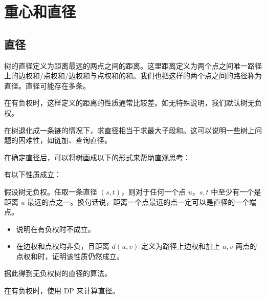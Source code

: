 \chapter{重心和直径}
\section{直径}

树的直径定义为距离最远的两点之间的距离。这里距离定义为两个点之间唯一路径上的边权和/点权和/边权和与点权和的和。我们也把这样的两个点之间的路径称为直径。直径可能存在多条。
\begin{remark}
    在有负权时，这样定义的距离的性质通常比较差。如无特殊说明，我们默认树无负权。
\end{remark}
\begin{remark}
    在树退化成一条链的情况下，求直径相当于求最大子段和。这可以说明一些树上问题的困难性，如链加、查询直径。
\end{remark}

在确定直径后，可以将树画成以下的形式来帮助直观思考：

\begin{center}
\end{center}

有以下性质成立：

\begin{property}
    假设树无负权。任取一条直径 $(s,t)$，则对于任何一个点 $u$，$s,t$ 中至少有一个是距离 $u$ 最远的点之一。换句话说，距离一个点最远的点一定可以是直径的一个端点。
\end{property}
\begin{exercise}
    \begin{itemize}
        \item 说明在有负权时不成立。
        \item 在边权和点权均非负，且距离 $d(u,v)$ 定义为路径上边权和加上 $u,v$ 两点的点权和时，证明该性质仍然成立。
    \end{itemize}
\end{exercise}
\begin{exercise}
    据此得到无负权树的直径的算法。
\end{exercise}
\begin{exercise}
    在有负权时，使用 DP 来计算直径。
\end{exercise}

